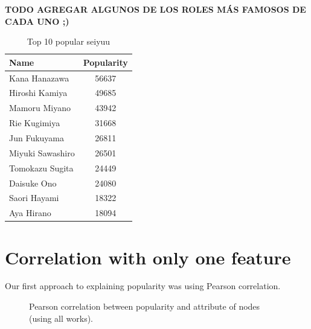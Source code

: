 \textbf{TODO AGREGAR ALGUNOS DE LOS ROLES MÁS FAMOSOS DE CADA UNO ;)}

\begin{table}[!h]
	\begin{center}
	\caption{Top 10 popular seiyuu}
	\label{tab:top10Popularity}
	\begin{tabular}{|l|c|}
		\hline
		Name & Popularity \\ 
		\hline
		Kana Hanazawa & 56637 \\ 
		\hline
		Hiroshi Kamiya & 49685 \\ 
		\hline
		Mamoru Miyano & 43942 \\ 
		\hline
		Rie Kugimiya & 31668 \\ 
		\hline
		Jun Fukuyama & 26811 \\ 
		\hline
		Miyuki Sawashiro & 26501 \\ 
		\hline
		Tomokazu Sugita & 24449 \\ 
		\hline
		Daisuke Ono & 24080 \\ 
		\hline
		Saori Hayami & 18322 \\ 
		\hline
		Aya Hirano & 18094 \\ 
		\hline
	\end{tabular}
	\end{center}
\end{table}

\newpage
\section{Correlation with only one feature}
Our first approach to explaining popularity was using Pearson correlation.

\begin{figure}[!h]
	\begin{flushleft}
	\caption{Pearson correlation between popularity and attribute of nodes (using all works).}
	\label{fig:pearsonCorrAllWorks}
	\end{flushleft}
\end{figure}

